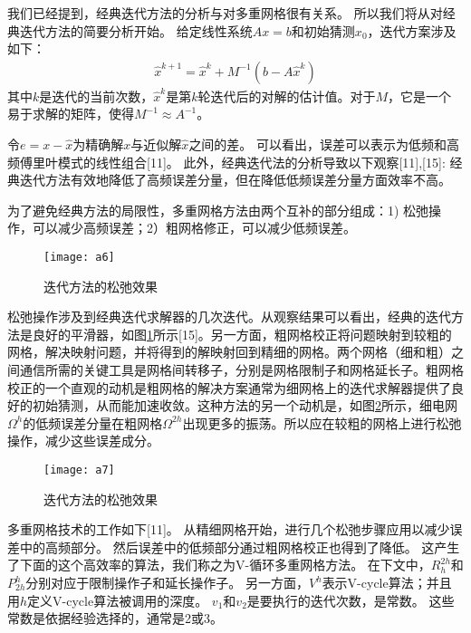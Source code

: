 我们已经提到，经典迭代方法的分析与对多重网格很有关系。 所以我们将从对经典迭代方法的简要分析开始。 给定线性系统$Ax = b$和初始猜测$x_0$，迭代方案涉及如下：
\begin{align}
\hat{x}^{k+1}=\hat{x}^{k}+M^{-1}(b-A\hat{x}^k)
\end{align}
其中$k$是迭代的当前次数，$\hat{x}^k$是第$k$轮迭代后的对解的估计值。对于$M$，它是一个易于求解的矩阵，使得$M^{-1}\approx A^{-1}$。

令$e = x-\hat{x}$为精确解$x$与近似解$\hat{x}$之间的差。 可以看出，误差可以表示为低频和高频傅里叶模式的线性组合[11]。 此外，经典迭代法的分析导致以下观察[11],[15]:
经典迭代方法有效地降低了高频误差分量，但在降低低频误差分量方面效率不高。

为了避免经典方法的局限性，多重网格方法由两个互补的部分组成：1) 松弛操作，可以减少高频误差；2）粗网格修正，可以减少低频误差。

\begin{figure}[H] %
  \centering
  \texttt{[image: a6]}
  \caption{迭代方法的松弛效果}
  \label{fig:a6}
\end{figure}

松弛操作涉及到经典迭代求解器的几次迭代。从观察结果可以看出，经典的迭代方法是良好的平滑器，如图\ref{fig:a6}所示[15]。另一方面，粗网格校正将问题映射到较粗的网格，解决映射问题，并将得到的解映射回到精细的网格。两个网格（细和粗）之间通信所需的关键工具是网格间转移子，分别是网格限制子和网格延长子。粗网格校正的一个直观的动机是粗网格的解决方案通常为细网格上的迭代求解器提供了良好的初始猜测，从而能加速收敛。这种方法的另一个动机是，如图\ref{fig:a7}所示，细电网$\Omega^h$的低频误差分量在粗网格$\Omega^{2h}$出现更多的振荡。所以应在较粗的网格上进行松弛操作，减少这些误差成分。

\begin{figure}[H] %
  \centering
  \texttt{[image: a7]}
  \caption{迭代方法的松弛效果}
  \label{fig:a7}
\end{figure}

多重网格技术的工作如下[11]。 从精细网格开始，进行几个松弛步骤应用以减少误差中的高频部分。 然后误差中的低频部分通过粗网格校正也得到了降低。 这产生了下面的这个高效率的算法，我们称之为V-循环多重网格方法。 在下文中，$R_h^{2h}$和$P^h_{2h}$分别对应于限制操作子和延长操作子。 另一方面，$V^h$表示V-cycle算法；并且用$h$定义V-cycle算法被调用的深度。 $v_1$和$v_2$是要执行的迭代次数，是常数。 这些常数是依据经验选择的，通常是2或3。

